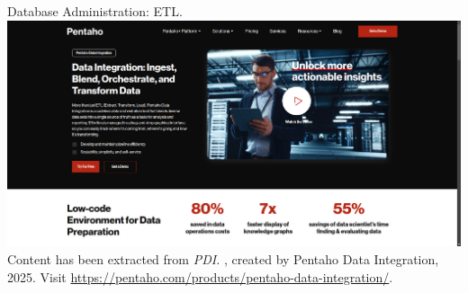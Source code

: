 \documentclass{beamer}
\begin{document}
\begin{frame}{Database Administration: ETL.}
    \centering
    \includegraphics[width=\textwidth]{figures/pdi}\\
    \vspace{2mm}
    {
        \scriptsize
        Content has been extracted from \textit{PDI.} , created by Pentaho Data Integration, 2025.  Visit \url{https://pentaho.com/products/pentaho-data-integration/}.\\
    }
\end{frame}
\end{document}
